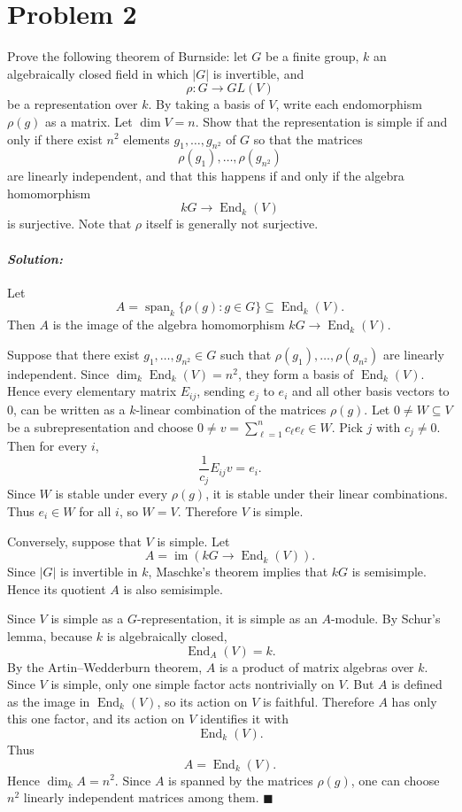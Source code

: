 \documentclass[12pt, a4paper]{article}
\theoremstyle{remark}
\newenvironment{solution}
  {\paragraph{\textit{Solution:}}\par\medskip}
  {\hfill$\blacksquare$\vspace{0.1cm}}
\begin{document}
\section*{Problem 2}

Prove the following theorem of Burnside: let \(G\) be a finite group, \(k\) an
algebraically closed field in which \(|G|\) is invertible, and
\[
\rho:G\to GL(V)
\]
be a representation over \(k\). By taking a basis of \(V\), write each
endomorphism \(\rho(g)\) as a matrix. Let \(\dim V=n\). Show that the
representation is simple if and only if there exist \(n^2\) elements
\(g_1,\dots,g_{n^2}\) of \(G\) so that the matrices
\[
\rho(g_1),\dots,\rho(g_{n^2})
\]
are linearly independent, and that this happens if and only if the algebra
homomorphism
\[
kG\to \operatorname{End}_k(V)
\]
is surjective. Note that \(\rho\) itself is generally not surjective.


\begin{solution}
    Let
\[
A=\operatorname{span}_k\{\rho(g):g\in G\}\subseteq \operatorname{End}_k(V).
\]
Then \(A\) is the image of the algebra homomorphism
$
kG\to \operatorname{End}_k(V).
$


Suppose that there exist \(g_1,\dots,g_{n^2}\in G\) such that
\(\rho(g_1),\dots,\rho(g_{n^2})\) are linearly independent. Since
\(\dim_k\operatorname{End}_k(V)=n^2\), they form a basis of
\(\operatorname{End}_k(V)\). Hence every elementary matrix \(E_{ij}\), sending
\(e_j\) to \(e_i\) and all other basis vectors to \(0\), can be written as a
\(k\)-linear combination of the matrices \(\rho(g)\).
Let \(0\neq W\subseteq V\) be a subrepresentation and choose
\(0\neq v=\sum_{\ell=1}^n c_\ell e_\ell\in W\). Pick \(j\) with \(c_j\neq 0\).
Then for every \(i\),
\[
\frac{1}{c_j}E_{ij}v=e_i.
\]
Since \(W\) is stable under every \(\rho(g)\), it is stable under their
linear combinations. Thus \(e_i\in W\) for all \(i\), so \(W=V\). Therefore
\(V\) is simple.


Conversely, suppose that \(V\) is simple. Let
\[
A=\operatorname{im}(kG\to \operatorname{End}_k(V)).
\]
Since \(|G|\) is invertible in \(k\), Maschke's theorem implies that \(kG\) is
semisimple. Hence its quotient \(A\) is also semisimple.

Since \(V\) is simple as a \(G\)-representation, it is simple as an
\(A\)-module. By Schur's lemma, because \(k\) is algebraically closed,
\[
\operatorname{End}_A(V)=k.
\]
By the Artin--Wedderburn theorem, \(A\) is a product of matrix algebras over
\(k\). Since \(V\) is simple, only one simple factor acts nontrivially on
\(V\). But \(A\) is defined as the image in \(\operatorname{End}_k(V)\), so its
action on \(V\) is faithful. Therefore \(A\) has only this one factor, and its
action on \(V\) identifies it with
\[
\operatorname{End}_k(V).
\]
Thus
\[
A=\operatorname{End}_k(V).
\]
Hence \(\dim_k A=n^2\). Since \(A\) is spanned by the matrices \(\rho(g)\), one
can choose \(n^2\) linearly independent matrices among them.
\end{solution}
\end{document}
